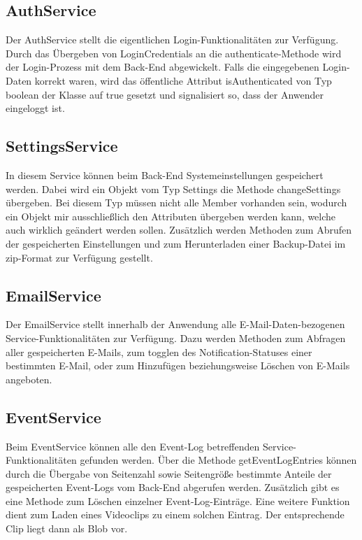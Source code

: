 \subsection{AuthService}
\label{subsection_authService}
Der AuthService stellt die eigentlichen Login-Funktionalitäten zur Verfügung. Durch das Übergeben von LoginCredentials an die authenticate-Methode wird der Login-Prozess mit dem Back-End abgewickelt. Falls die eingegebenen Login-Daten korrekt waren, wird das öffentliche Attribut \glqq{}isAuthenticated\grqq{} von Typ boolean der Klasse auf true gesetzt und signalisiert so, dass der Anwender eingeloggt ist.

\subsection{SettingsService}
\label{subsection_settingsService}
In diesem Service können beim Back-End Systemeinstellungen gespeichert werden. Dabei wird ein Objekt vom Typ Settings die Methode \glqq{}changeSettings\grqq{} übergeben. Bei diesem Typ müssen nicht alle Member vorhanden sein, wodurch ein Objekt mir ausschließlich den Attributen übergeben werden kann, welche auch wirklich geändert werden sollen. Zusätzlich werden Methoden zum Abrufen der gespeicherten Einstellungen und zum Herunterladen einer Backup-Datei im zip-Format zur Verfügung gestellt.

\subsection{EmailService}
Der EmailService stellt innerhalb der Anwendung alle E-Mail-Daten-bezogenen Service-Funktionalitäten zur Verfügung. Dazu werden Methoden zum Abfragen aller gespeicherten E-Mails, zum togglen des Notification-Statuses einer bestimmten E-Mail, oder zum Hinzufügen beziehungsweise Löschen von E-Mails angeboten.

\subsection{EventService}
\label{subsection_eventService}
Beim EventService können alle den Event-Log betreffenden Service-Funktionalitäten gefunden werden. Über die Methode \glqq{}getEventLogEntries\grqq{} können durch die Übergabe von Seitenzahl sowie Seitengröße bestimmte Anteile der gespeicherten Event-Logs vom Back-End abgerufen werden. Zusätzlich gibt es eine Methode zum Löschen einzelner Event-Log-Einträge. Eine weitere Funktion dient zum Laden eines Videoclips zu einem solchen Eintrag. Der entsprechende Clip liegt dann als Blob vor.

